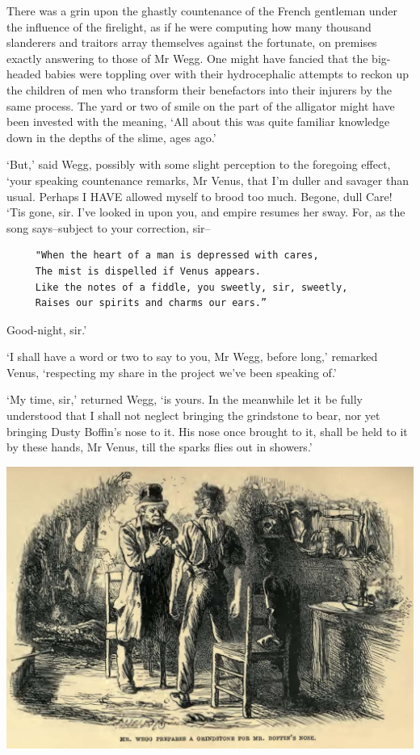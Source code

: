 There was a grin upon the ghastly countenance of the French gentleman
under the influence of the firelight, as if he were computing how many
thousand slanderers and traitors array themselves against the fortunate,
on premises exactly answering to those of Mr Wegg. One might have
fancied that the big-headed babies were toppling over with their
hydrocephalic attempts to reckon up the children of men who transform
their benefactors into their injurers by the same process. The yard or
two of smile on the part of the alligator might have been invested with
the meaning, ‘All about this was quite familiar knowledge down in the
depths of the slime, ages ago.’

‘But,’ said Wegg, possibly with some slight perception to the foregoing
effect, ‘your speaking countenance remarks, Mr Venus, that I’m duller
and savager than usual. Perhaps I HAVE allowed myself to brood too much.
Begone, dull Care! ‘Tis gone, sir. I’ve looked in upon you, and empire
resumes her sway. For, as the song says--subject to your correction,
sir--

\begin{verbatim}
     "When the heart of a man is depressed with cares,
     The mist is dispelled if Venus appears.
     Like the notes of a fiddle, you sweetly, sir, sweetly,
     Raises our spirits and charms our ears.”
\end{verbatim}

Good-night, sir.’

‘I shall have a word or two to say to you, Mr Wegg, before long,’
remarked Venus, ‘respecting my share in the project we’ve been speaking
of.’

‘My time, sir,’ returned Wegg, ‘is yours. In the meanwhile let it be
fully understood that I shall not neglect bringing the grindstone to
bear, nor yet bringing Dusty Boffin’s nose to it. His nose once brought
to it, shall be held to it by these hands, Mr Venus, till the sparks
flies out in showers.’

\includegraphics[scale=2.3]{03-14-01}

